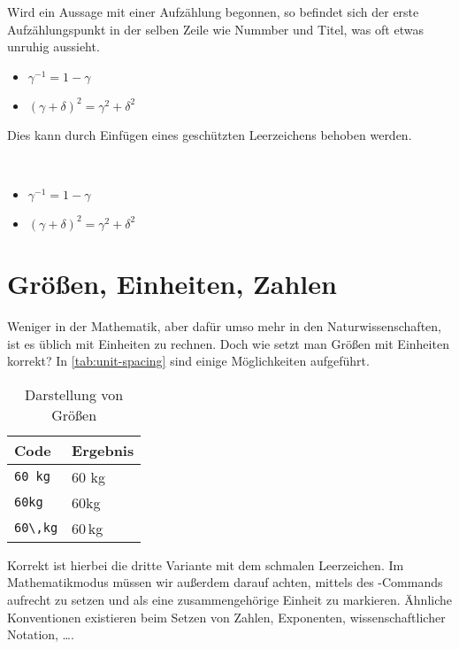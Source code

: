 Wird ein Aussage mit einer Aufzählung begonnen, so befindet sich der erste Aufzählungspunkt in der selben Zeile wie Nummber und Titel, was oft etwas unruhig aussieht.
\begin{latexlisting}
	\begin{proposition}
		\begin{itemize}
			\item $\gamma^{-1} = 1 - \gamma$
			\item $(\gamma + \delta)^2 = \gamma^2 + \delta^2$
		\end{itemize}
	\end{proposition}
\end{latexlisting}
Dies kann durch Einfügen eines geschützten Leerzeichens behoben werden.
\begin{latexlisting}
	\begin{proposition}~
		\begin{itemize}
			\item $\gamma^{-1} = 1 - \gamma$
			\item $(\gamma + \delta)^2 = \gamma^2 + \delta^2$
		\end{itemize}
	\end{proposition}
\end{latexlisting}

\section{Größen, Einheiten, Zahlen}

Weniger in der Mathematik, aber dafür umso mehr in den Naturwissenschaften, ist es üblich mit Einheiten zu rechnen.
Doch wie setzt man Größen mit Einheiten korrekt?
In \autoref{tab:unit-spacing} sind einige Möglichkeiten aufgeführt.
\begin{table}[!h]
	\begin{tabular}{l l}
		\toprule
		\textbf{Code} & \textbf{Ergebnis}\tabularnewline
		\midrule
		\texttt{60 kg}&
		60 kg
		\tabularnewline
		\texttt{60kg}&
		60kg
		\tabularnewline
		\texttt{60\textbackslash,kg}&
		60\,kg
		\tabularnewline
		\bottomrule
	\end{tabular}
	\caption{Darstellung von Größen}
	\label{tab:unit-spacing}
\end{table}
Korrekt ist hierbei die dritte Variante mit dem schmalen Leerzeichen.
Im Mathematikmodus müssen wir außerdem darauf achten,  mittels des -Commands aufrecht zu setzen und als eine zusammengehörige Einheit zu markieren.
Ähnliche Konventionen existieren beim Setzen von Zahlen, Exponenten, wissenschaftlicher Notation, \dots.

